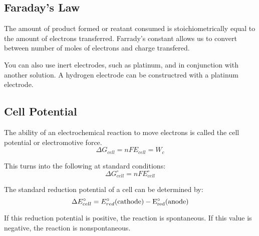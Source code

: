 \documentclass{article}
\begin{document}
\subsection{Faraday's Law}

The amount of product formed or reatant consumed is stoichiometrically equal to
the amount of electrons transferred. Farrady's constant allows us to convert
between number of moles of electrons and charge transfered. 

You can also use inert electrodes, such as platinum, and in conjunction with
another solution. A hydrogen electrode can be constructred with a platinum
electrode.

\subsection{Cell Potential}

The ability of an electrochemical reaction to move electrons is called the cell
potential or electromotive force.
$$\Delta G_{cell} = nFE_{cell} = W_c$$

This turns into the following at standard conditions:
$$\Delta G_{cell}^{\circ} = n F E_{cell}^{\circ}$$

The standard reduction potential of a cell can be determined by:
$$\Delta E^{\circ}_{cell} = E_{red}^{\circ}(\rm{cathode}) -
E_{red}^{\circ}(\rm{anode})$$

If this reduction potential is positive, the reaction is spontaneous. If this
value is negative, the reaction is nonspontaneous.
\end{document}
